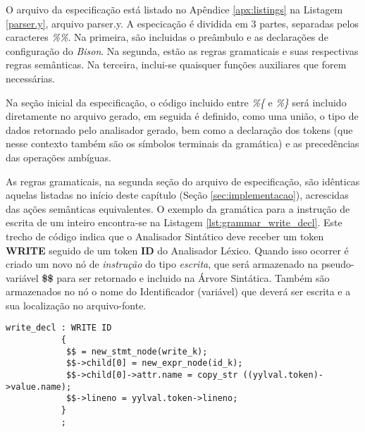 O arquivo da especificação está listado no Apêndice \ref{apx:listings} na Listagem
\ref{parser.y}, arquivo parser.y. A especicação é dividida em 3 partes,
separadas pelos caracteres \emph{\%\%}. Na primeira, são incluidas o preâmbulo
e as declarações de configuração do \emph{Bison}. Na segunda, estão as regras
gramaticais e suas respectivas regras semânticas. Na terceira, inclui-se
quaisquer funções auxiliares que forem necessárias.

Na seção inicial da especificação, o código incluido entre \emph{\%\{} e
\emph{\%\}} será incluido diretamente no arquivo gerado, em seguida é
definido, como uma união, o tipo de dados retornado pelo analisador gerado,
bem como a declaração dos tokens (que nesse contexto também são os símbolos
terminais da gramática) e as precedências das operações ambíguas.

As regras gramaticais, na segunda seção do arquivo de especificação, são
idênticas aquelas listadas no início deste capítulo (Seção
\ref{sec:implementacao}), acrescidas das ações semânticas equivalentes. O
exemplo da gramática para a instrução de escrita de um inteiro encontra-se
na Listagem \ref{lst:grammar_write_decl}. Este trecho de código indica que o
Analisador Sintático deve receber um token \textbf{WRITE} seguido de um token
\textbf{ID} do Analisador Léxico. Quando isso ocorrer é criado um novo nó de
\emph{instrução} do tipo \emph{escrita}, que será armazenado na
pseudo-variável \textbf{\$\$} para ser retornado e incluido na Árvore
Sintática. Também são armazenados no nó o nome do Identificador (variável) que
deverá ser escrita e a sua localização no arquivo-fonte.

\begin{lstlisting}[label=lst:grammar_write_decl,caption=Instrução de Escrita]
write_decl : WRITE ID
           {
            $$ = new_stmt_node(write_k);
            $$->child[0] = new_expr_node(id_k);
            $$->child[0]->attr.name = copy_str ((yylval.token)->value.name);
            $$->lineno = yylval.token->lineno;
           }
           ;
\end{lstlisting}

